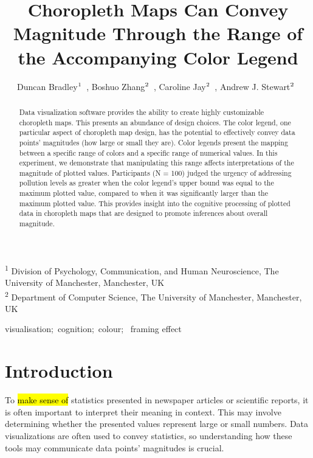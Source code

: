 \documentclass[
]{interact}
\title{Choropleth Maps Can Convey Magnitude Through the Range of the
Accompanying Color Legend}
\author{Duncan
Bradley$\textsuperscript{1}$~\orcidlink{0000-0001-7328-8779}, Boshuo
Zhang$\textsuperscript{2}$~\orcidlink{0000-0003-0477-9122}, Caroline
Jay$\textsuperscript{2}$~\orcidlink{0000-0002-6080-1382}, Andrew J.
Stewart$\textsuperscript{2}$~\orcidlink{0000-0002-9795-4104}}
\newcommand{\rev}[1]{\hl{#1}}
\begin{document}
\maketitle
\textsuperscript{1} Division of Psychology, Communication, and Human
Neuroscience, The University of
Manchester, Manchester, UK\\ \textsuperscript{2} Department of Computer
Science, The University of Manchester, Manchester, UK
\begin{abstract}
Data visualization software provides the ability to create highly
customizable choropleth maps. This presents an abundance of design
choices. The color legend, one particular aspect of choropleth map
design, has the potential to effectively convey data points' magnitudes
(how large or small they are). Color legends present the mapping between
a specific range of colors and a specific range of numerical values. In
this experiment, we demonstrate that manipulating this range affects
interpretations of the magnitude of plotted values. Participants (N =
100) judged the urgency of addressing pollution levels as greater when
the color legend's upper bound was equal to the maximum plotted value,
compared to when it was significantly larger than the maximum plotted
value. This provides insight into the cognitive processing of plotted
data in choropleth maps that are designed to promote inferences about
overall magnitude.
\end{abstract}
\begin{keywords}
\def\sep{;\ }
visualisation\sep cognition\sep colour\sep 
framing effect
\end{keywords}
\ifdefined\Shaded\renewenvironment{Shaded}{\begin{tcolorbox}[borderline west={3pt}{0pt}{shadecolor}, breakable, enhanced, sharp corners, interior hidden, boxrule=0pt, frame hidden]}{\end{tcolorbox}}\fi

\hypertarget{sec-intro}{%
\section{Introduction}\label{sec-intro}}

To \rev{make sense of} statistics presented in newspaper articles or
scientific reports, it is often important to interpret their meaning in
context. This may involve determining whether the presented values
represent large or small numbers. Data visualizations are often used to
convey statistics, so understanding how these tools may communicate data
points' magnitudes is crucial.
\end{document}
